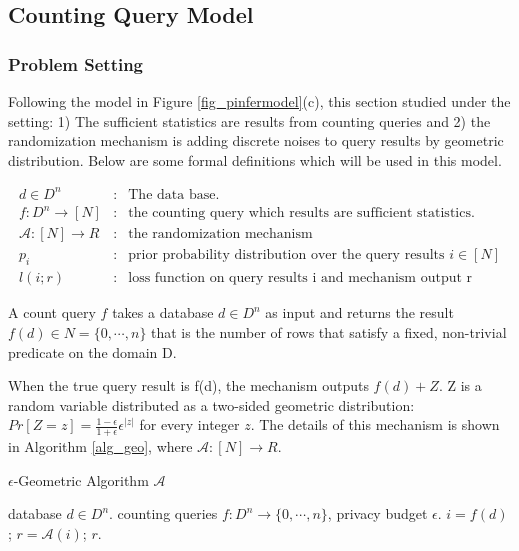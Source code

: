 \documentclass{article}
\begin{document}
\subsection{Counting Query Model \texorpdfstring{\cite{ghosh2012universally}}{}}
%

\subsubsection{Problem Setting}
%
Following the model in Figure \ref{fig_pinfermodel}(c), this section studied under the setting: 1) The sufficient statistics are results from counting queries and 2) the randomization mechanism is adding discrete noises to query results by geometric distribution. Below are some formal definitions which will be used in this model.

%
%
\[
\begin{array}{lcl}
	d \in D^n 
	& : &
	\mbox{The data base}.\\
	f : D^n \rightarrow [N]
	& : & \mbox{the counting query which results are sufficient statistics.}\\
	\mathcal{A}: [N] \rightarrow R
	& : & \mbox{the randomization mechanism}\\
	p_i
	& : & \mbox{prior probability distribution over the query results } i \in [N]\\
	l(i; r)
	& : & \mbox{loss function on query results i and mechanism output r}
\end{array}
\]
%
%
\begin{defn}
A count query $f$ takes a database $d \in D^n$ as input and returns the result $f(d) \in N = \{0, \cdots ,n\}$ that is the number of rows that satisfy a fixed, non-trivial predicate on the domain D.
\end{defn}
%
\begin{defn}
When the true query result is f(d), the mechanism outputs $f(d)+Z$. Z is a random variable distributed as a two-sided geometric distribution: 
$Pr[Z = z] = \frac{1 - \epsilon}{1 + \epsilon} \epsilon^{|z|}$
for every integer $z$. The details of this mechanism is shown in Algorithm \ref{alg_geo}, where $\mathcal{A}: [N] \rightarrow R $.
%
\begin{algorithm}
\caption{$\epsilon$-Geometric Algorithm $\mathcal{A}$}
\label{alg_geo}
\begin{algorithmic}
\REQUIRE database $d \in D^n$.
 counting queries $f : D^n \rightarrow \{0, \cdots ,n\}$,  privacy budget $\epsilon$.
 $i = f(d)$; 
 $r = \mathcal{A}(i)$; 
\STATE  {}
\RETURN $r$.
\end{algorithmic}
\end{algorithm} 
%
\end{defn}
\end{document}

